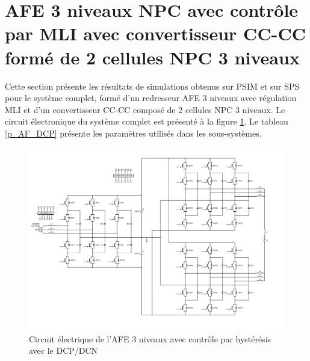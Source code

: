 \section{AFE 3 niveaux NPC avec contrôle par MLI avec convertisseur CC-CC formé de 2 cellules NPC 3 niveaux}
Cette section présente les résultats de simulations obtenus sur PSIM et sur SPS pour le système complet, formé d'un redresseur AFE 3 niveaux avec régulation MLI et d'un convertisseur CC-CC composé de 2 cellules NPC 3 niveaux.  Le circuit électronique du système complet est présenté à la figure \ref{circuit_AFE_3L_RC_DCP_DCN}. Le tableau \ref{p_AF_DCP} présente les paramètres utilisés dans les sous-systèmes.

\begin{figure}[htb]
\centering
\includegraphics[scale=0.6]{fig/AFE_3L_RC_DCP_DCN.png}
\caption{Circuit électrique de l'AFE 3 niveaux avec contrôle par hystérésis avec le DCP/DCN}
\label{circuit_AFE_3L_RC_DCP_DCN}
\end{figure}


